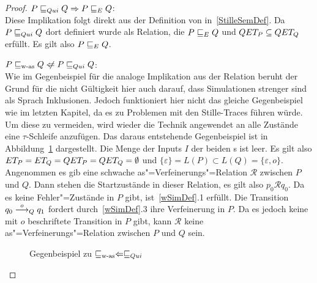 \begin{proof}
  $P  \sqsubseteq  _{Qui} Q \Rightarrow P  \sqsubseteq  _E Q$:\\
  Diese Implikation folgt direkt aus der Definition von \QRel{}
  in~\ref{StilleSemDef}. Da $P  \sqsubseteq  _{Qui} Q$ dort definiert wurde als Relation, die
  $P  \sqsubseteq  _E Q$ und $QET _P \subseteq QET _Q$ erfüllt. Es gilt also $P  \sqsubseteq  _E Q$.

  $P \wasRel Q \hspace{0.1cm}\not\hspace{-0.1cm}\Leftarrow P \QRel Q$:\\
  Wie im Gegenbeispiel für die analoge Implikation aus der Relation \ERel{}
  beruht der Grund für die nicht Gültigkeit hier auch darauf, dass Simulationen
  strenger sind als Sprach Inklusionen. Jedoch funktioniert hier nicht das
  gleiche Gegenbeispiel wie im letzten Kapitel, da es zu Problemen mit den
  Stille-Traces führen würde. Um diese zu vermeiden, wird wieder die Technik
  angewendet an alle Zustände eine $\tau$-Schleife anzufügen. Das daraus
  entstehende Gegenbeispiel ist in Abbildung~\ref{WasQuiGegenBsp} dargestellt.
  Die Menge der Inputs $I$ der beiden \MEIO{}s ist leer. Es gilt also $ET _P =
  ET _Q = QET _P = QET _Q = \emptyset$ und $\{\varepsilon\} = L(P) \subset
  L(Q) = \{\varepsilon , o\}$.\\
  Angenommen es gib eine schwache as"=Verfeinerungs"=Relation $\mathcal{R}$
  zwischen $P$ und $Q$. Dann stehen die Startzustände in dieser Relation, es
  gilt also $p_0 \mathcal{R} q_0$. Da es keine Fehler"=Zustände in $P$ gibt,
  ist~\ref{wSimDef}.1 erfüllt. Die Transition $q_0 \must[o]_Q q_1$ fordert
  durch~\ref{wSimDef}.3 ihre Verfeinerung in $P$. Da es jedoch keine mit $o$
  beschriftete Transition in $P$ gibt, kann $\mathcal{R}$ keine
  as"=Verfeinerungs"=Relation zwischen $P$ und $Q$ sein.

  \begin{figure}[htbp]
    \begin{center}
      \caption{Gegenbeispiel zu $\sqsubseteq _{\mathrm{w}\text{-}\mathrm{as}} \Leftarrow  \sqsubseteq  _{Qui}$}
      \label{WasQuiGegenBsp}
    \end{center}
  \end{figure}


\end{proof}
